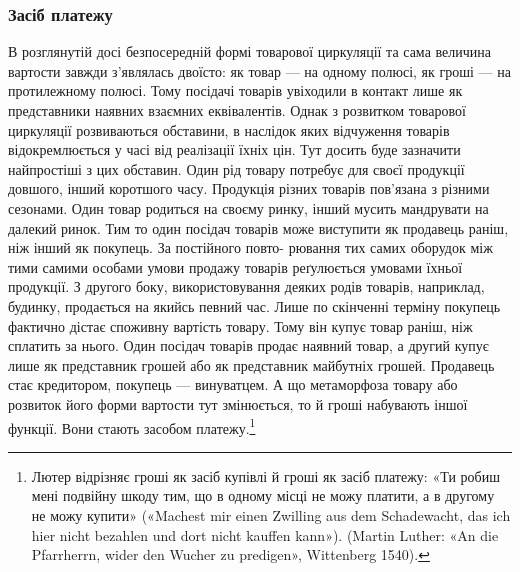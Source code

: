 \subsubsection{Засіб платежу}

В розглянутій досі безпосередній формі товарової циркуляції
та сама величина вартости завжди з’являлась двоїсто: як товар —
на одному полюсі, як гроші — на протилежному полюсі. Тому
посідачі товарів увіходили в контакт лише як представники
наявних взаємних еквівалентів. Однак з розвитком товарової
циркуляції розвиваються обставини, в наслідок яких відчуження
товарів відокремлюється у часі від реалізації їхніх цін. Тут
досить буде зазначити найпростіші з цих обставин. Один рід
товару потребує для своєї продукції довшого, інший коротшого
часу. Продукція різних товарів пов’язана з різними сезонами.
Один товар родиться на своєму ринку, інший мусить мандрувати
на далекий ринок. Тим то один посідач товарів може виступити
як продавець раніш, ніж інший як покупець. За постійного повто-
рювання тих самих оборудок між тими самими особами умови
продажу товарів реґулюється умовами їхньої продукції. З другого
боку, використовування деяких родів товарів, наприклад,
будинку, продається на якийсь певний час. Лише по скінченні
терміну покупець фактично дістає споживну вартість товару.
Тому він купує товар раніш, ніж сплатить за нього. Один посідач
товарів продає наявний товар, а другий купує лише як представник
грошей або як представник майбутніх грошей. Продавець
стає кредитором, покупець — винуватцем. А що метаморфоза товару
або розвиток його форми вартости тут змінюється, то й гроші
набувають іншої функції. Вони стають засобом платежу.\footnote{
Лютер відрізняє гроші як засіб купівлі й гроші як засіб платежу:
«Ти робиш мені подвійну шкоду тим, що в одному місці не можу платити,
а в другому не можу купити» («Machest mir einen Zwilling aus dem Schadewacht,
das ich hier nicht bezahlen und dort nicht kauffen kann»). (Martin Luther:
«An die Pfarrherrn, wider den Wucher zu predigen», Wittenberg 1540).
}

